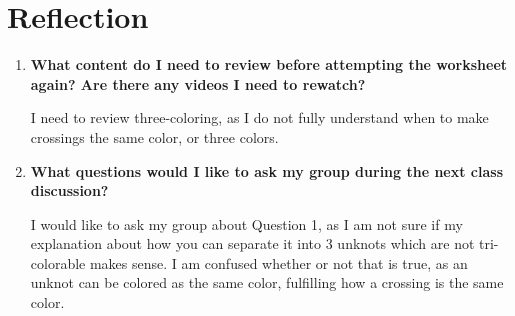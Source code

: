 \documentclass[article, 12pt]{article}
\theoremstyle{definition}
\begin{document}
    \section*{Reflection}
    \begin{enumerate}[1.]
        \item \textbf{What content do I need to review before attempting the worksheet again? Are there any videos I need to rewatch?}
        
        I need to review three-coloring, as I do not fully understand when to make crossings the same color, or three colors. 

        \item \textbf{What questions would I like to ask my group during the next class discussion?}
        
        I would like to ask my group about Question 1, as I am not sure if my explanation about how you can separate it into 3 unknots which are not tri-colorable makes sense. I am confused whether or not that is true, as an unknot can be colored as the same color, fulfilling how a crossing is the same color.
    \end{enumerate}
\end{document}
